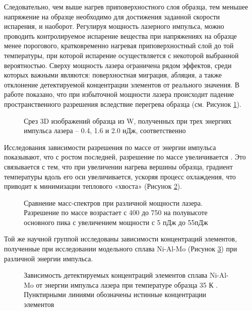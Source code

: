 Следовательно, чем выше нагрев приповерхностного слоя образца, тем меньшее напряжение на образце необходимо для достижения заданной скорости испарения, и наоборот. Регулируя мощность лазерного импульса, можно проводить контролируемое испарение вещества при напряжениях на образце менее порогового, кратковременно нагревая приповерхностный слой до той температуры, при которой испарение осуществляется с некоторой выбранной вероятностью. Сверху мощность лазера ограничена рядом эффектов, среди которых важными являются: поверхностная миграция, абляция, а также отклонение детектируемой концентрации элементов от реального значения. В работе \cite{Cerezo07} показано, что при избыточной мощности лазера происходит падение пространственного разрешения вследствие перегрева образца (см. Рисунок \cref{fig:ParamsEnergy}).

\begin{figure}[htb]
	\caption{Срез 3D изображений образца из W, полученных при трех энергиях импульса лазера – 0.4, 1.6 и 2.0 нДж, соответственно \cite{Cerezo07}}
	\label{fig:ParamsEnergy}
\end{figure}

Исследования зависимости разрешения по массе от энергии импульса показывают, что с ростом последней, разрешение по массе увеличивается \cite{Tu15}. Это связывается с тем, что при увеличении нагрева вершины образца, градиент температуры вдоль его оси увеличивается, ускоряя процесс охлаждения, что приводит к минимизации теплового «хвоста» (Рисунок \cref{fig:ParamsPower}).

\begin{figure}[htb]
	\caption{Сравнение масс-спектров при различной мощности лазера. Разрешение по массе возрастает с 400 до 750 на полувысоте основного пика с увеличением мощности с 5 пДж до 55пДж \cite{Tu15}}
	\label{fig:ParamsPower}
\end{figure}

Той же научной группой исследованы зависимости концентраций элементов, полученные при исследовании модельного сплава Ni-Al-Mo (Рисунок \cref{fig:ParamsComposition}) при различной энергии импульса.

\begin{figure}[htb]
	\caption{Зависимость детектируемых концентраций элементов сплава Ni-Al-Mo от энергии импульса лазера при температуре образца 35 К \cite{Tu15}. Пунктирными линиями обозначены истинные концентрации элементов}
	\label{fig:ParamsComposition}
\end{figure}

